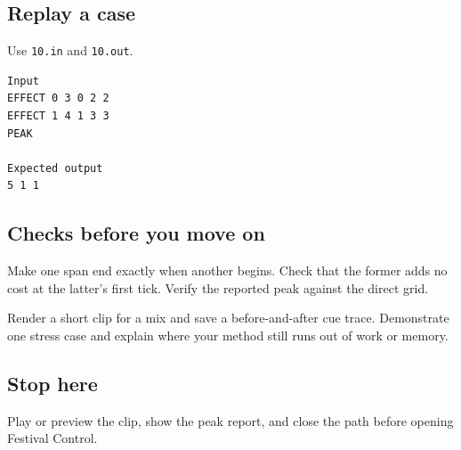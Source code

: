 \documentclass[11pt,letterpaper]{article}
\begin{document}
\subsection*{Replay a case}

Use \texttt{10.in} and \texttt{10.out}.

\begin{samepage}
\small
\begin{verbatim}
Input
EFFECT 0 3 0 2 2
EFFECT 1 4 1 3 3
PEAK

Expected output
5 1 1
\end{verbatim}
\end{samepage}

\subsection*{Checks before you move on}

Make one span end exactly when another begins. Check that the former adds no cost at the latter's first tick. Verify the reported peak against the direct grid.

Render a short clip for a mix and save a before-and-after cue trace. Demonstrate one stress case and explain where your method still runs out of work or memory.

\subsection*{Stop here}

Play or preview the clip, show the peak report, and close the path before opening Festival Control.
\end{document}

